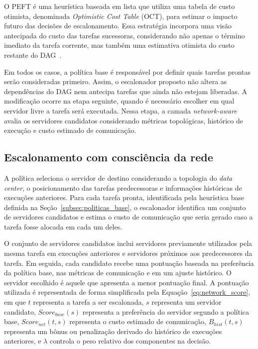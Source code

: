 \documentclass[12pt]{article}
\begin{document}
O PEFT é uma heurística baseada em lista que utiliza uma tabela de custo otimista, denominada \textit{Optimistic Cost Table} (OCT), para estimar o impacto futuro das decisões de escalonamento. 
%
Essa estratégia incorpora uma visão antecipada do custo das tarefas sucessoras, considerando não apenas o término imediato da tarefa corrente, mas também uma estimativa otimista do custo restante do DAG~\cite{arabnejad2014peft}.

Em todos os casos, a política base é responsável por definir quais tarefas prontas serão consideradas primeiro. 
%
Assim, o escalonador proposto não altera as dependências do DAG nem antecipa tarefas que ainda não estejam liberadas. 
%
A modificação ocorre na etapa seguinte, quando é necessário escolher em qual servidor livre a tarefa será executada. 
%
Nessa etapa, a camada \textit{network-aware} avalia os servidores candidatos considerando métricas topológicas, histórico de execução e custo estimado de comunicação.


\subsection{Escalonamento com consciência da rede}
\label{subsec:politica_network_aware}

A política seleciona o servidor de destino considerando a topologia do \textit{data center}, o posicionamento das tarefas predecessoras e informações históricas de execuções anteriores. 
%
Para cada tarefa pronta, identificada pela heurística base definida na Seção~\ref{subsec:politicas_base}, o escalonador identifica um conjunto de servidores candidatos e estima o custo de comunicação que seria gerado caso a tarefa fosse alocada em cada um deles.

O conjunto de servidores candidatos inclui servidores previamente utilizados pela mesma tarefa em execuções anteriores e servidores próximos aos predecessores da tarefa.
%
Em seguida, cada candidato recebe uma pontuação baseada na preferência da política base, nas métricas de comunicação e em um ajuste histórico. 
%
O servidor escolhido é aquele que apresenta a menor pontuação final.
%
A pontuação utilizada é representada de forma simplificada pela Equação~\ref{eq:network_score}, em que $t$ representa a tarefa a ser escalonada, $s$ representa um servidor candidato, $Score_{base}(s)$ representa a preferência do servidor segundo a política base, $Score_{net}(t,s)$ representa o custo estimado de comunicação, $B_{hist}(t,s)$ representa um bônus ou penalização derivado do histórico de execuções anteriores, e $\lambda$ controla o peso relativo dos componentes na decisão.
\end{document}
